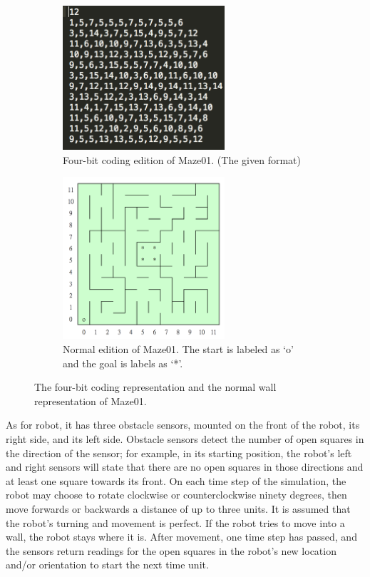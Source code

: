 \documentclass[11pt, oneside]{article}   	%
\begin{document}
\begin{figure}
\centering
\begin{subfigure}{7cm}
  \centering
  \includegraphics[width=6cm]{coded_maze01.png}
  \caption{Four-bit coding edition of Maze01. (The given format)}
  \label{fig:four-bit-Maze01}
\end{subfigure}%
\begin{subfigure}{7cm}
  \centering
  \includegraphics[width=6cm]{maze-01.png}
  \caption{Normal edition of Maze01. The start is labeled as `o' and the goal is labels as `*'.}
  \label{fig:Maze01}
\end{subfigure}
\caption{The four-bit coding representation and the normal wall representation of Maze01.}
\label{fig:test}
\end{figure}

As for robot, it has three obstacle sensors, mounted on the front of the robot, its right side, and its left side. Obstacle sensors detect the number of open squares in the direction of the sensor; for example, in its starting position, the robot's left and right sensors will state that there are no open squares in those directions and at least one square towards its front. On each time step of the simulation, the robot may choose to rotate clockwise or counterclockwise ninety degrees, then move forwards or backwards a distance of up to three units. It is assumed that the robot's turning and movement is perfect. If the robot tries to move into a wall, the robot stays where it is. After movement, one time step has passed, and the sensors return readings for the open squares in the robot's new location and/or orientation to start the next time unit.
\end{document}
